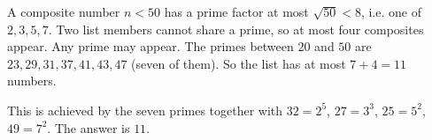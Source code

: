 A composite number $n<50$ has a prime factor at most $\sqrt{50}<8$, i.e. one of $2,3,5,7$. Two list members cannot share a prime, so at most four composites appear. Any prime may appear. The primes between $20$ and $50$ are $23,29,31,37,41,43,47$ (seven of them). So the list has at most $7+4=11$ numbers.

This is achieved by the seven primes together with $32=2^5$, $27=3^3$, $25=5^2$, $49=7^2$. The answer is $\boxed{11}$.
